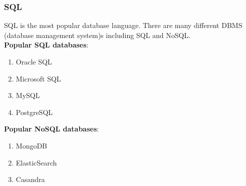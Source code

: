 \documentclass{beamer}
\begin{document}

\begin{frame}
    \frametitle{SQL}
    SQL is the most popular database language. There are many different DBMS (database management system)s including SQL and NoSQL. \\
    \textbf{Popular SQL databases}:
    \begin{enumerate}
        \item Oracle SQL
        \item Microsoft SQL
        \item MySQL
        \item PostgreSQL
    \end{enumerate}    

    \textbf{Popular NoSQL databases}:
    \begin{enumerate}
        \item MongoDB
        \item ElasticSearch
        \item Casandra
    \end{enumerate}    
\end{frame}
\end{document}
